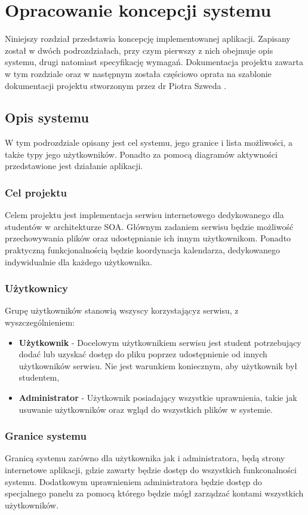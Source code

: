 \chapter{Opracowanie koncepcji systemu}
\label{cha:koncepcjaSystemu}
Niniejszy rozdział przedstawia koncepcję implementowanej aplikacji. Zapisany został w dwóch podrozdziałach, przy czym pierwszy z nich obejmuje opis systemu, drugi natomiast specyfikację wymagań. Dokumentacja projektu zawarta w tym rozdziale oraz w następnym została częściowo oprata na szablonie dokumentacji projektu stworzonym przez dr Piotra Szweda \cite{DOC01}.
\section{Opis systemu}
W tym podrozdziale opisany jest cel systemu, jego granice i lista możliwości, a także typy jego użytkowników. Ponadto za pomocą diagramów aktywności przedstawione jest działanie aplikacji.
\subsection{Cel projektu}
Celem projektu jest implementacja serwisu internetowego dedykowanego dla studentów w architekturze SOA. Głównym zadaniem serwisu będzie możliwość przechowywania plików oraz udostępnianie ich innym użytkownikom. Ponadto praktyczną funkcjonalnością będzie koordynacja kalendarza, dedykowanego indywidualnie dla każdego użytkownika. 

\subsection{Użytkownicy}
Grupę użytkowników stanowią wszyscy korzystającyz serwisu, z wyszczególnieniem:
\begin{itemize}
	\item \textbf{Użytkownik} - Docelowym użytkownikiem serwisu jest student potrzebujący dodać lub uzyskać dostęp do pliku poprzez udostępnienie od innych użytkowników serwisu. Nie jest warunkiem koniecznym, aby użytkownik był studentem,
	\item \textbf{Administrator} - Użytkownik posiadający wszystkie uprawnienia, takie jak usuwanie użytkowników oraz wgląd do wszystkich plików w systemie.
\end{itemize}

\subsection{Granice systemu}
Granicą systemu zarówno dla użytkownika jak i administratora, będą strony internetowe aplikacji, gdzie zawarty będzie dostęp do wszystkich funkconalności systemu. Dodatkowym uprawnieniem administratora będzie dostęp do specjalnego panelu za pomocą którego będzie mógł zarządzać kontami wszystkich użytkowników.

